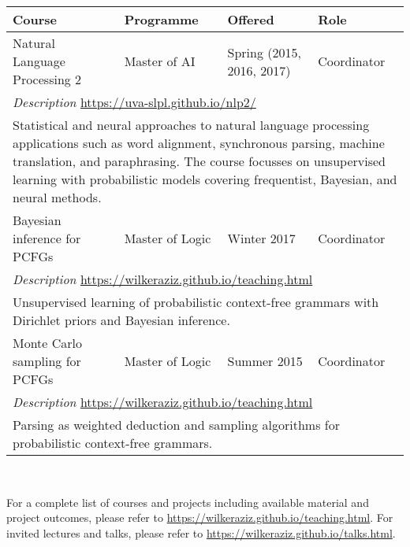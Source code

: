 \begin{tabular}{l l l l }
\bf Course & \bf Programme & \bf Offered & \bf Role \\ \hline
Natural Language Processing 2 & Master of AI & Spring (2015, 2016, 2017) & Coordinator \\
\multicolumn{4}{l}{\emph{Description} \hfill \url{https://uva-slpl.github.io/nlp2/}}\\
\multicolumn{4}{p{\textwidth}}{Statistical and neural approaches to natural language processing applications such as word alignment, synchronous parsing, machine translation, and paraphrasing. The course focusses on unsupervised learning with probabilistic models covering frequentist, Bayesian, and neural methods.} \\ \hline
Bayesian inference for PCFGs & Master of Logic & Winter 2017 & Coordinator \\
\multicolumn{4}{l}{\emph{Description} \hfill \url{https://wilkeraziz.github.io/teaching.html}}\\
\multicolumn{4}{p{\textwidth}}{Unsupervised learning of probabilistic context-free grammars with Dirichlet priors and Bayesian inference.} \\  \hline
Monte Carlo sampling for PCFGs & Master of Logic & Summer 2015 & Coordinator \\
\multicolumn{4}{l}{\emph{Description} \hfill \url{https://wilkeraziz.github.io/teaching.html}}\\
\multicolumn{4}{p{\textwidth}}{Parsing as weighted deduction and sampling algorithms for probabilistic context-free grammars.} \\ \hline
\end{tabular}

~

For a complete list of courses and projects including available material and project outcomes, please refer to \url{https://wilkeraziz.github.io/teaching.html}.
For invited lectures and talks, please refer to \url{https://wilkeraziz.github.io/talks.html}.



